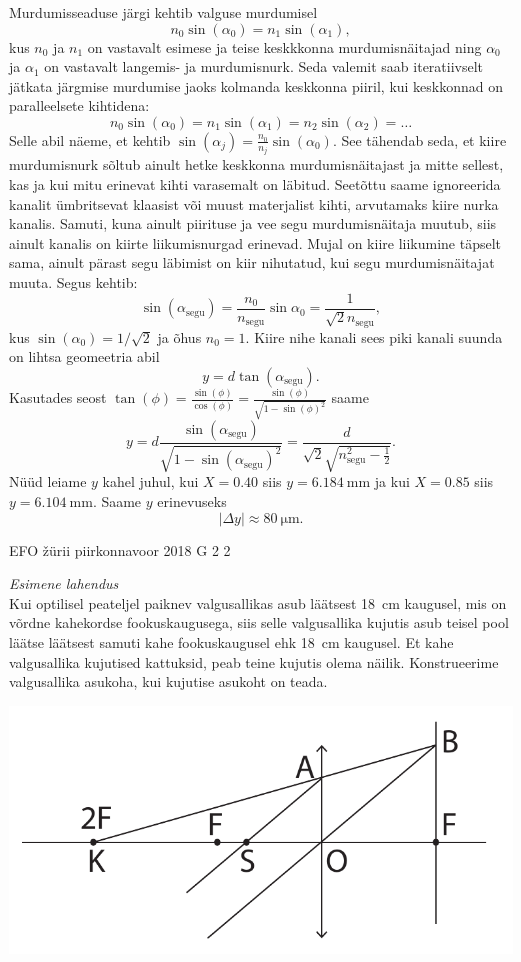 \documentclass[11pt]{article}
\begin{document}
{{\ifSolution
Murdumisseaduse järgi kehtib valguse murdumisel
$$n_0\sin(\alpha_0)=n_1\sin(\alpha_1),$$
kus $n_0$ ja $n_1$ on vastavalt esimese ja teise keskkkonna murdumisnäitajad ning $\alpha_0$ ja $\alpha_1$ on vastavalt langemis- ja murdumisnurk. Seda valemit saab iteratiivselt jätkata järgmise murdumise jaoks kolmanda keskkonna piiril, kui keskkonnad on paralleelsete kihtidena:
$$n_0\sin(\alpha_0)=n_1\sin(\alpha_1)=n_2\sin(\alpha_2) = \dots$$
Selle abil näeme, et kehtib $\sin(\alpha_j)=\frac{n_0}{n_j}\sin(\alpha_0)$. See tähendab seda, et kiire murdumisnurk sõltub ainult hetke keskkonna murdumisnäitajast ja mitte sellest, kas ja kui mitu erinevat kihti varasemalt on läbitud. Seetõttu saame ignoreerida kanalit ümbritsevat klaasist või muust materjalist kihti, arvutamaks kiire nurka kanalis. Samuti, kuna ainult piirituse ja vee segu murdumisnäitaja muutub, siis ainult kanalis on kiirte liikumisnurgad erinevad. Mujal on kiire liikumine täpselt sama, ainult pärast segu läbimist on kiir nihutatud, kui segu murdumisnäitajat muuta. Segus kehtib:
$$\sin(\alpha_{\text{segu}})=\frac{n_0}{n_{\text{segu}}}\sin{\alpha_0} = \frac{1}{\sqrt{2}n_{\text{segu}}},$$
kus $\sin(\alpha_0) = 1/\sqrt{2}$ ja õhus $n_0=1$. Kiire nihe kanali sees piki kanali suunda on lihtsa geomeetria abil $$y=d\tan(\alpha_{\text{segu}}).$$
Kasutades seost $\tan(\phi) = \frac{\sin(\phi)}{\cos(\phi)} = \frac{\sin(\phi)}{\sqrt{1-\sin(\phi)^2}}$ saame
$$y = d \frac{\sin(\alpha_{\text{segu}})}{\sqrt{1-\sin(\alpha_{\text{segu}})^2}} = \frac{d}{\sqrt{2}\sqrt{n_{\text{segu}}^2-\frac12}}.$$
Nüüd leiame $y$ kahel juhul, kui $X=\num{0.40}$ siis $y=\SI{6.184}{\milli\meter}$ ja kui $X=\num{0.85}$ siis $y=\SI{6.104}{\milli\meter}$. Saame $y$ erinevuseks
$$|\Delta y| \approx \SI{80}{\micro\meter}.$$
\fi
}

{EFO žürii} %
{piirkonnavoor} %
{2018} %
{G 2} %
{2} %
{

\ifSolution
\emph{Esimene lahendus}\\
Kui optilisel peateljel paiknev valgusallikas asub läätsest \SI{18}{cm} kaugusel, mis on võrdne kahekordse fookuskaugusega, siis selle valgusallika kujutis asub teisel pool läätse läätsest samuti kahe fookuskaugusel ehk \SI{18}{cm} kaugusel. Et kahe valgusallika kujutised kattuksid, peab teine kujutis olema näilik.
Konstrueerime valgusallika asukoha, kui kujutise asukoht on teada. 
 \vspace{-10pt}
 \begin{center}
 \includegraphics[width=0.7\linewidth]{2018-v2g-02-valgusallikaslah}
 \end{center}
 \vspace{-10pt}

}}
\end{document}
